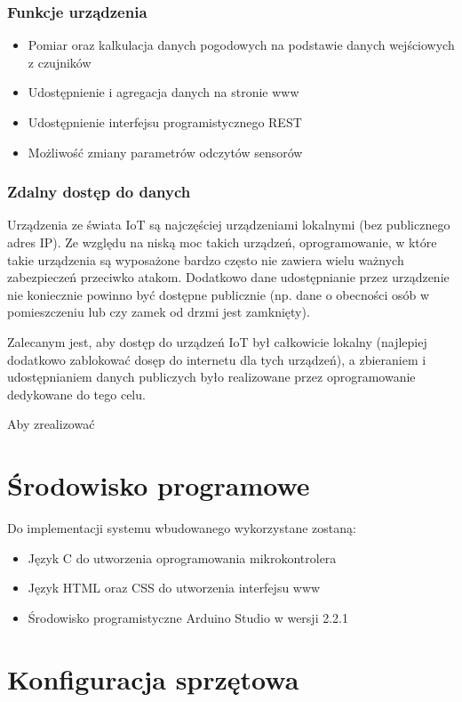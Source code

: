 \documentclass[12pt,a4paper]{article}
\begin{document}
\subsubsection{Funkcje urządzenia}
\begin{itemize}
    \item Pomiar oraz kalkulacja danych pogodowych na podstawie danych wejściowych z czujników
    \item Udostępnienie i agregacja danych na stronie www
    \item Udostępnienie interfejsu programistycznego REST
    \item Możliwość zmiany parametrów odczytów sensorów
\end{itemize}

\subsubsection{Zdalny dostęp do danych}

Urządzenia ze świata IoT są najczęściej urządzeniami lokalnymi (bez publicznego adres IP). 
Ze względu na niską moc takich urządzeń, oprogramowanie, w które takie urządzenia są wyposażone bardzo często nie zawiera 
wielu ważnych zabezpieczeń przeciwko atakom. Dodatkowo dane udostępnianie przez urządzenie nie koniecznie powinno być dostępne publicznie 
(np. dane o obecności osób w pomieszczeniu lub czy zamek od drzmi jest zamknięty). 

Zalecanym jest, aby dostęp do urządzeń IoT był całkowicie lokalny (najlepiej dodatkowo zablokować dosęp do internetu dla tych urządzeń),
a zbieraniem i udostępnianiem danych publiczych było realizowane przez oprogramowanie dedykowane do tego celu.

Aby zrealizować 

\section{Środowisko programowe}
Do implementacji systemu wbudowanego wykorzystane zostaną:
\begin{itemize}
    \item Język C do utworzenia oprogramowania mikrokontrolera
    \item Język HTML oraz CSS do utworzenia interfejsu www
    \item Środowisko programistyczne Arduino Studio w wersji 2.2.1
\end{itemize}

\section{Konfiguracja sprzętowa}
\end{document}
